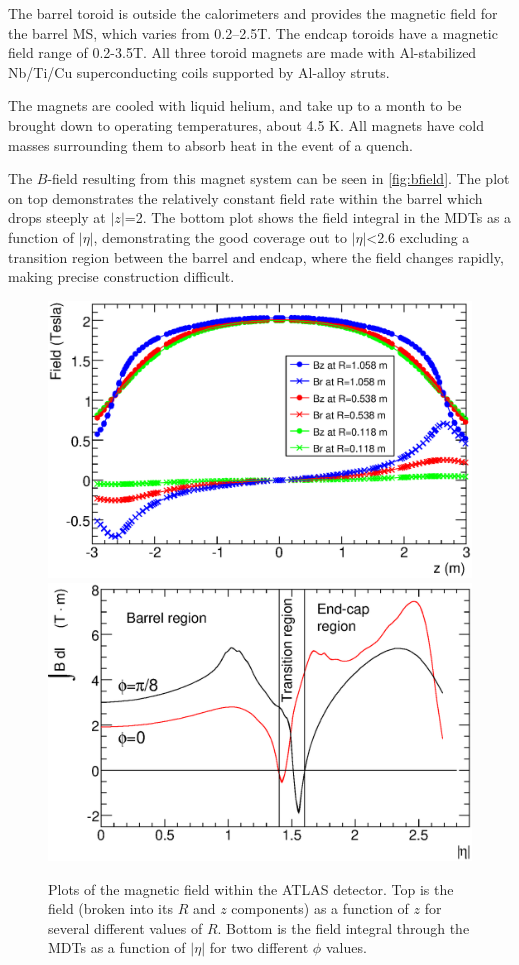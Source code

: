 The barrel toroid is outside the calorimeters and provides the magnetic field for the barrel \ac{MS}, which varies from 0.2–2.5T. The endcap toroids have a magnetic field range of 0.2-3.5T. All three toroid magnets are made with Al-stabilized Nb/Ti/Cu superconducting coils supported by Al-alloy struts. 

The magnets are cooled with liquid helium, and take up to a month to be brought down to operating temperatures, about 4.5 K. All magnets have cold masses surrounding them to absorb heat in the event of a quench. 

The $B$-field resulting from this magnet system can be seen in \autoref{fig:bfield}. The plot on top demonstrates the relatively constant field rate within the barrel which drops steeply at $|z|$=2. The bottom plot shows the field integral in the \acp{MDT} as a function of $|\eta|$, demonstrating the good coverage out to $|\eta|$<2.6 excluding a transition region between the barrel and endcap, where the field changes rapidly, making precise \pt construction difficult. 

\begin{centering}
\begin{figure}[!htb]
\myfloatalign
\includegraphics[width=.90\linewidth]{figures/atlas/solMeasB.eps}
\includegraphics[width=.90\linewidth]{figures/atlas/IBdl.eps}
\caption{Plots of the magnetic field within the \ac{ATLAS} detector. Top is the field (broken into its $R$ and $z$ components) as a function of $z$ for several different values of $R$. Bottom is the field integral through the \acp{MDT} as a function of $|\eta|$ for two different $\phi$ values. }
\label{fig:bfield}
\end{figure}
\end{centering}

